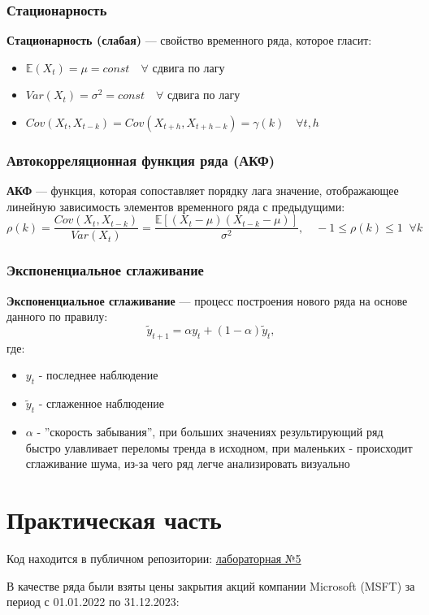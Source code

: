 \documentclass[a4paper, 12pt]{report}
\begin{document}
\subsection{Стационарность}
\textbf{Стационарность (слабая)} — свойство временного ряда, которое гласит:
\begin{itemize}
    \setlength{\itemsep}{0pt}
    \item $\mathbb{E} (X_t) = \mu = const \quad \forall$ сдвига по лагу
    \item $Var(X_t) = \sigma^2 = const \quad \forall$ сдвига по лагу
    \item $Cov(X_t, X_{t-k}) = Cov(X_{t+h}, X_{t+h-k}) = \gamma (k) \quad \forall t, h$
\end{itemize}

\subsection{Автокорреляционная функция ряда (АКФ)}  

\textbf{АКФ} — функция, которая сопоставляет порядку лага значение, отображающее линейную зависимость 
элементов временного ряда с предыдущими:
\[ \rho (k) = \frac{Cov(X_t, X_{t-k})}{Var(X_t)} = \frac{\mathbb{E} [(X_t - \mu)(X_{t-k} - \mu)]}{\sigma^2}, \quad -1 \leq \rho(k) \leq 1 \; \; \forall k\]

\subsection{Экспоненциальное сглаживание}
\textbf{Экспоненциальное сглаживание} — процесс построения нового ряда на основе данного по правилу:
\[\widetilde{y}_{t+1} = \alpha y_t + (1 - \alpha) \widetilde{y}_t,\]
где:
\begin{itemize}
    \setlength{\itemsep}{0pt}
    \item $y_t$ - последнее наблюдение
    \item $\widetilde{y}_t$ - сглаженное наблюдение
    \item $\alpha$ - ''скорость забывания'', при больших значениях результирующий ряд быстро улавливает 
    переломы тренда в исходном, при маленьких - происходит сглаживание шума, из-за чего ряд легче анализировать визуально
\end{itemize}


\chapter*{Практическая часть}
\setcounter{chapter}{2}
\setcounter{section}{0}
Код находится в публичном репозитории: \textcolor{red}{\href{https://github.com/quant1on/stat_lab5}{лабораторная №5}} \par
В качестве ряда были взяты цены закрытия акций компании Microsoft (MSFT) за период с 01.01.2022 по 31.12.2023:
\end{document}
